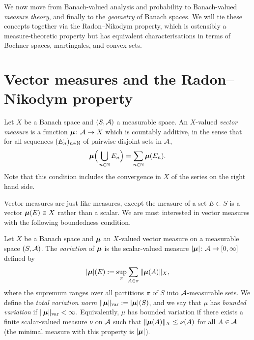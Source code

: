 We now move from Banach-valued analysis and probability to Banach-valued \emph{measure theory}, and finally to the \emph{geometry} of Banach spaces.
We will tie these concepts together via the Radon--Nikodym property, which is ostensibly a measure-theoretic property but has equivalent characterisations in terms of Bochner spaces, martingales, and convex sets.

\section{Vector measures and the Radon--Nikodym property}

\begin{defn}
  Let $X$ be a Banach space and $(S,\mathcal{A})$ a measurable space.
  An $X$-valued \emph{vector measure} is a function $\bm{\mu} \colon \mathcal{A} \rightarrow X$ which is countably additive, in the sense that for all sequences $(E_n)_{n \in \mathbb{N}}$ of pairwise disjoint sets in $\mathcal{A}$,
  \begin{equation*}
    \bm{\mu}\Big( \bigcup_{n \in \mathbb{N}} E_n \Big) = \sum_{n \in \mathbb{N}} \bm{\mu}(E_n).
  \end{equation*}
  Note that this condition includes the convergence in $X$ of the series on the right hand side.
\end{defn}

Vector measures are just like measures, except the measure of a set $E \subset S$ is a vector $\bm{\mu}(E) \in X$ rather than a scalar.
We are most interested in vector measures with the following boundedness condition.

\begin{defn}
  Let $X$ be a Banach space and $\bm{\mu}$ an $X$-valued vector measure on a measurable space $(S,\mathcal{A})$.
  The \emph{variation} of $\bm{\mu}$ is the scalar-valued measure $|\bm{\mu}| \colon \mathcal{A} \rightarrow [0,\infty]$ defined by
  \begin{equation*}
    |\bm{\mu}|(E) := \sup_{\pi} \sum_{A \in \pi} \|\bm{\mu}(A)\|_X,
  \end{equation*}
  where the supremum ranges over all partitions $\pi$ of $S$ into $\mathcal{A}$-measurable sets.
  We define the \emph{total variation norm} $\|\bm{\mu}\|_{\mathrm{var}} := |\bm{\mu}|(S)$, and we say that $\mu$ has \emph{bounded variation} if $\|\bm{\mu}\|_{\mathrm{var}} < \infty$.
  Equivalently, $\mu$ has bounded variation if there exists a finite scalar-valued measure $\nu$ on $\mathcal{A}$ such that $\|\bm{\mu}(A)\|_X \leq \nu(A)$ for all $A \in \mathcal{A}$ (the minimal measure with this property is $|\bm{\mu}|$).
\end{defn}

